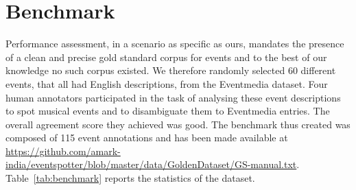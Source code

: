 \documentclass[10pt,a4paper]{article}
\begin{document}
\section{Benchmark}{
Performance assessment, in a scenario as specific as ours, mandates the presence of a clean and precise gold standard corpus for events and to the best of our knowledge no such corpus existed. We therefore randomly selected 60 different events, that all had English descriptions, from the Eventmedia dataset. Four human annotators participated in the task of analysing these event descriptions to spot musical events and to disambiguate them to Eventmedia entries. The overall agreement score they achieved was good. The benchmark thus created was composed of 115 event annotations and has been made available at \url{https://github.com/amark-india/eventspotter/blob/master/data/GoldenDataset/GS-manual.txt}. Table~\ref{tab:benchmark} reports the statistics of the dataset.


}
\end{document}
